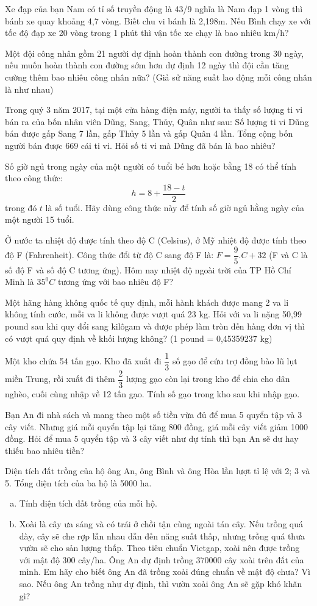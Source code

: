 \bt Xe đạp của bạn Nam có tỉ số truyền động là 43/9 nghĩa là Nam đạp 1 vòng thì bánh xe quay khoảng 4,7 vòng. Biết chu vi bánh là 2,198m. Nếu Bình chạy xe với tốc độ đạp xe 20 vòng trong 1 phút thì vận tốc xe chạy là bao nhiêu km/h?

\bt%
Một đội công nhân gồm 21 người dự định hoàn thành con đường trong 30 ngày, nếu muốn hoàn thành con đường sớm hơn dự định 12 ngày thì đội cần tăng cường thêm bao nhiêu công nhân nữa? (Giả sử năng suất lao động mỗi công nhân là như nhau)

\bt%
Trong quý 3 năm 2017, tại một cửa hàng điện máy, người ta thấy số lượng ti vi bán ra của bốn nhân viên Dũng, Sang, Thủy, Quân như sau: Số lượng ti vi Dũng bán được gấp Sang 7 lần, gấp Thủy 5 lần và gấp Quân 4 lần. Tổng cộng bốn người bán được 669 cái ti vi. Hỏi số ti vi mà Dũng đã bán là bao nhiêu?

\bt Số giờ ngủ trong ngày của một người có tuổi bé hơn hoặc bằng 18 có thể tính theo công thức:
$$h=8+\dfrac{18-t}{2}$$
trong đó $t$ là số tuổi. Hãy dùng công thức này để tính số giờ ngủ hằng ngày của một người 15 tuổi.

\bt Ở nước ta nhiệt độ được tính theo độ C (Celsius), ở Mỹ nhiệt độ được tính theo độ F (Fahrenheit). Công thức đổi từ độ C sang độ F là: $F=\dfrac{9}{5}.C+32$ (F và C là số độ F và số độ C tương ứng). Hôm nay nhiệt độ ngoài trời của TP Hồ Chí Minh là $35^0C$ tương ứng với bao nhiêu độ F?

\bt Một hãng hàng không quốc tế quy định, mỗi hành khách được mang 2 va li không tính cước, mỗi va li không được vượt quá 23 kg. Hỏi với va li nặng 50,99 pound sau khi quy đổi sang kilôgam và được phép làm tròn đến hàng đơn vị thì có vượt quá quy định về khối lượng không? (1 pound = 0,45359237 kg)

\bt Một kho chứa 54 tấn gạo. Kho đã xuất đi $\dfrac{1}{3}$ số gạo để cứu trợ đồng bào lũ lụt miền Trung, rồi xuất đi thêm $\dfrac{2}{3}$ lượng gạo còn lại trong kho để chia cho dân nghèo, cuối cùng nhập về 12 tấn gạo. Tính số gạo trong kho sau khi nhập gạo.

\bt Bạn An đi nhà sách và mang theo một số tiền vừa đủ để mua 5 quyển tập và 3 cây viết. Nhưng giá mỗi quyển tập lại tăng 800 đồng, giá mỗi cây viết giảm 1000 đồng. Hỏi để mua 5 quyển tập và 3 cây viết như dự tính thì bạn An sẽ dư hay thiếu bao nhiêu tiền?

\bt Diện tích đất trồng của hộ ông An, ông Bình và ông Hòa lần lượt tỉ lệ với 2; 3 và 5. Tổng diện tích của ba hộ là 5000 ha. 
\begin{enumerate}[a)]
\item Tính diện tích đất trồng của mỗi hộ.
\item Xoài là cây ưa sáng và có trái ở chồi tận cùng ngoài tán cây. Nếu trồng quá dày, cây sẽ che rợp lẫn nhau dẫn đến năng suất thấp, nhưng trồng quá thưa vườn sẽ cho sản lượng thấp. Theo tiêu chuẩn Vietgap, xoài nên được trồng với mật độ 300 cây/ha. Ông An dự định trồng $370 000$ cây xoài trên đất của mình. Em hãy cho biết ông An đã trồng xoài đúng chuẩn về mật độ chưa? Vì sao. Nếu ông An trồng như dự định, thì vườn xoài ông An sẽ gặp khó khăn gì? 
\end{enumerate}

